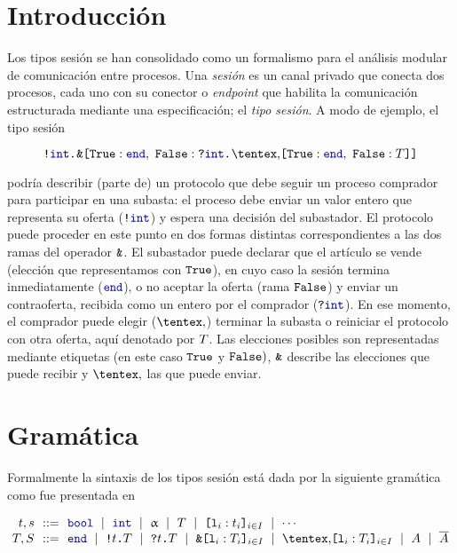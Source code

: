 \section{Introducción}

Los tipos sesión se han consolidado como un formalismo para el
análisis modular de comunicación entre procesos. Una \emph{sesión} es un canal
privado que conecta dos procesos, cada uno con su conector o \emph{endpoint}
que habilita la comunicación estructurada mediante una especificación; el
\emph{tipo sesión}. A modo de ejemplo, el tipo sesión

\begin{equation}
    \label{eq:bare.auction}
    \Out\tint{
        \BinaryPBranch[]\End{
            \In\tint{
                \BinaryPChoice[]\End\T
            }
        }
    }
\end{equation}

\noindent podría describir (parte de) un protocolo que debe seguir un proceso comprador
para participar en una subasta: el proceso debe enviar un valor entero que representa su
oferta ($ \Out [] \tint $) y espera una decisión del subastador. El protocolo
puede proceder en este punto en dos formas distintas correspondientes a las dos
ramas del operador $\Branch$. El subastador puede declarar que el artículo se
vende (elección que representamos con $\Tag[True]$), en cuyo caso la sesión
termina inmediatamente ($ \End $), o no aceptar la oferta (rama $\Tag[False]$)
y enviar un contraoferta, recibida como un entero por el comprador ($ \In []
\tint $). En ese momento, el comprador puede elegir ($\Choice$) terminar la
subasta o reiniciar el protocolo con otra oferta, aquí denotado por $\T$. Las
elecciones posibles son representadas mediante etiquetas (en este caso
$\Tag[True]$ y $\Tag[False])$, $\Branch$ describe las elecciones que puede
recibir y $\Choice$ las que puede enviar.

\section{Gramática}

Formalmente la sintaxis de los tipos sesión está dada por la siguiente
gramática como fue presentada en~\cite{Melgratti2017AnOI}

\[
\begin{array}{@{}r@{~~}c@{~~}l@{}}
\TypeT, \TypeS & ::= &
\tbool
\rulemid \tint
\rulemid \tvar
\rulemid \SessionType
\rulemid \set[i\in I]{ \Tag_i : \Type_i }
\rulemid \cdots
\\
\SessionTypeT, \SessionTypeS & ::= &
\End
\rulemid \Out\Type\SessionType
\rulemid \In\Type\SessionType
\rulemid \Branch \set[i\in I]{\Tag_i : \SessionType_i}
\rulemid \Choice \set[i\in I]{\Tag_i : \SessionType_i}
\rulemid \etvar
\rulemid \dual\etvar
\end{array}
\]


